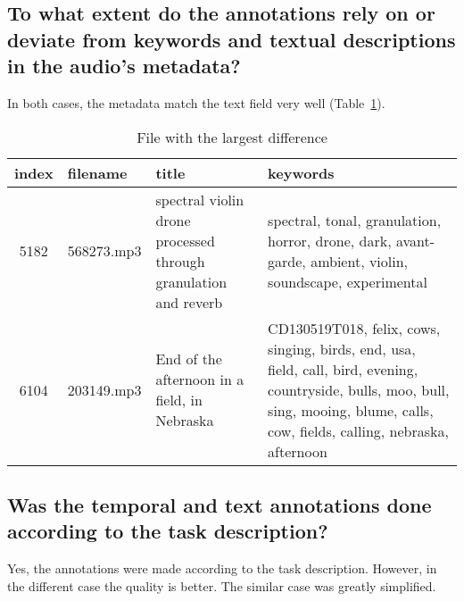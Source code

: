 \subsection{To what extent do the annotations rely on or deviate from keywords and textual descriptions in the audio’s metadata?}
\label{sec:Case Study:b}

In both cases, the metadata match the text field very well (Table~\ref{tab:metadata match}).

\begin{table}[h]
  \caption{File with the largest difference}
  \label{tab:metadata match}
  \centering
  \begin{tabular}{clp{4cm}p{8.5cm}}
    \toprule
    index & filename & title & keywords \\
    \midrule
    5182 & 568273.mp3 & spectral violin drone processed through granulation and reverb & spectral, tonal, granulation, horror, drone, dark, avant-garde, ambient, violin, soundscape, experimental \\
    6104 & 203149.mp3 & End of the afternoon in a field, in Nebraska & CD130519T018, felix, cows, singing, birds, end, usa, field, call, bird, evening, countryside, bulls, moo, bull, sing, mooing, blume, calls, cow, fields, calling, nebraska, afternoon \\
    \bottomrule
  \end{tabular}
\end{table}

\subsection{Was the temporal and text annotations done according to the task description?}
\label{sec:Case Study:c}

Yes, the annotations were made according to the task description. 
However, in the different case the quality is better. 
The similar case was greatly simplified.


